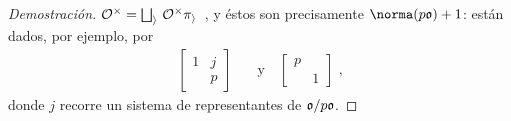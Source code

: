 \begin{proof}[Demostraci\'{o}n]
\begin{math}
			\cal{O}^{\times}=
			\bigsqcup_{i}\,\cal{O}^{\times}\pi_{i}
	\end{math}~,
	y \'{e}stos son precisamente $\norma(p\frak{o})+1$: est\'{a}n dados,
	por ejemplo, por
	\begin{align*}
		\begin{bmatrix} 1 & j \\ & p \end{bmatrix}
			& \quad\text{y}\quad
		\begin{bmatrix} p & \\ & 1 \end{bmatrix}
			\text{ ,}
	\end{align*}
	donde $j$ recorre un sistema de representantes de $\frak{o}/p\frak{o}$.
\end{proof}

